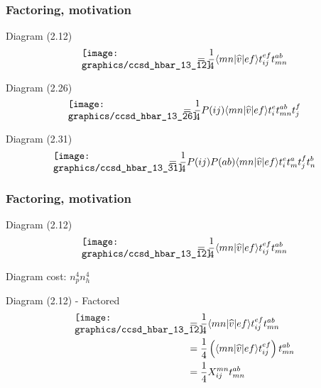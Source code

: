 \begin{frame}
    \frametitle{Factoring, motivation}

\small
\begin{block}{Diagram (2.12)}
    \begin{equation*}
        \parbox{40mm}{\texttt{[image: graphics/ccsd\_hbar\_13\_12]}}
        = \frac{1}{4}  \bra{mn}\op{v}\ket{ef} t_{ij}^{ef} t_{mn}^{ab}
    \end{equation*}
\end{block}
\begin{block}{Diagram (2.26)}
    \begin{equation*}
        \parbox{40mm}{\texttt{[image: graphics/ccsd\_hbar\_13\_26]}}
        = \frac{1}{4} P(ij) \bra{mn}\op{v}\ket{ef} t_i^e t_{mn}^{ab} t_j^f
    \end{equation*}
\end{block}
\begin{block}{Diagram (2.31)}
    \begin{equation*}
        \parbox{40mm}{\texttt{[image: graphics/ccsd\_hbar\_13\_31]}}
        = \frac{1}{4} P(ij) P(ab) \bra{mn}\op{v}\ket{ef} t_i^e t_m^a t_j^f t_n^b
    \end{equation*}
\end{block}
\end{frame}

\begin{frame}
    \frametitle{Factoring, motivation}

\scriptsize
\begin{block}{Diagram (2.12)}
    \begin{equation*}
        \parbox{40mm}{\texttt{[image: graphics/ccsd\_hbar\_13\_12]}}
        = \frac{1}{4}  \bra{mn}\op{v}\ket{ef} t_{ij}^{ef} t_{mn}^{ab}
    \end{equation*}
\end{block}
Diagram cost: $n_p^4 n_h^4$
\begin{block}{Diagram (2.12) - Factored}
\small
    \begin{align*}
        \parbox{40mm}{\texttt{[image: graphics/ccsd\_hbar\_13\_12]}}
        &= \frac{1}{4}  \bra{mn}\op{v}\ket{ef} t_{ij}^{ef} t_{mn}^{ab} \\
        &= \frac{1}{4}  \left(\bra{mn}\op{v}\ket{ef} t_{ij}^{ef}\right)  t_{mn}^{ab} \\
        &= \frac{1}{4} X_{ij}^{mn} t_{mn}^{ab}
    \end{align*}
\end{block}
\end{frame}

